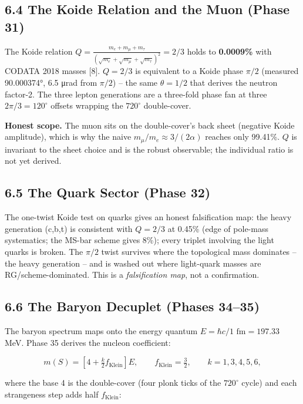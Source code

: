 \documentclass[
  11pt,
]{article}
\begin{document}
\subsection{6.4 The Koide Relation and the Muon (Phase
31)}\label{the-koide-relation-and-the-muon-phase-31}

The Koide relation
\(Q = \frac{m_e + m_\mu + m_\tau}{(\sqrt{m_e} + \sqrt{m_\mu} + \sqrt{m_\tau})^2} = 2/3\)
holds to \textbf{0.0009\%} with CODATA 2018 masses {[}8{]}. \(Q = 2/3\)
is equivalent to a Koide phase \(\pi/2\) (measured 90.000374°, 6.5 μrad
from \(\pi/2\)) -- the same \(\theta = 1/2\) that derives the neutron
factor-2. The three lepton generations are a three-fold phase fan at
three \(2\pi/3 = 120^{\circ}\) offsets wrapping the \(720^{\circ}\)
double-cover.

\textbf{Honest scope.} The muon sits on the double-cover's back sheet
(negative Koide amplitude), which is why the naive
\(m_\mu/m_e \approx 3/(2\alpha)\) reaches only 99.41\%. \(Q\) is
invariant to the sheet choice and is the robust observable; the
individual ratio is not yet derived.

\subsection{6.5 The Quark Sector (Phase
32)}\label{the-quark-sector-phase-32}

The one-twist Koide test on quarks gives an honest falsification map:
the heavy generation (c,b,t) is consistent with \(Q = 2/3\) at 0.45\%
(edge of pole-mass systematics; the MS-bar scheme gives 8\%); every
triplet involving the light quarks is broken. The \(\pi/2\) twist
survives where the topological mass dominates -- the heavy generation --
and is washed out where light-quark masses are RG/scheme-dominated. This
is a \emph{falsification map}, not a confirmation.

\subsection{6.6 The Baryon Decuplet (Phases
34--35)}\label{the-baryon-decuplet-phases-3435}

The baryon spectrum maps onto the energy quantum
\(E = \hbar c/1\text{ fm} = 197.33\) MeV. Phase 35 derives the nucleon
coefficient:

\[m(S) = \left[4 + \tfrac{k}{2}f_{\text{Klein}}\right]E, \qquad f_{\text{Klein}} = \tfrac{3}{2}, \qquad k = 1, 3, 4, 5, 6,\]

where the base 4 is the double-cover (four plonk ticks of the
\(720^{\circ}\) cycle) and each strangeness step adds half
\(f_{\text{Klein}}\):
\end{document}
